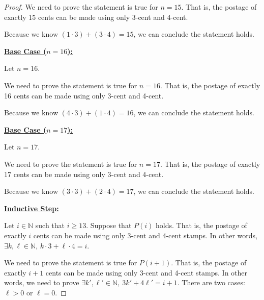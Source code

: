 \documentclass[12pt]{article}
\begin{document}
\begin{itemize}
\begin{proof}
    We need to prove the statement is true for $n = 15$. That is, the
    postage of exactly 15 cents can be made using only 3-cent and 4-cent.

    \bigskip

    Because we know $(1 \cdot 3) + (3 \cdot 4)=15$, we can conclude the statement holds.

    \bigskip

    \underline{\textbf{Base Case ($n = 16$):}}

    \bigskip

    Let $n = 16$.

    \bigskip

    We need to prove the statement is true for $n = 16$. That is, the
    postage of exactly 16 cents can be made using only 3-cent and 4-cent.

    \bigskip

    Because we know $(4 \cdot 3) + (1 \cdot 4)=16$, we can conclude the statement holds.

    \bigskip

    \underline{\textbf{Base Case ($n = 17$):}}

    \bigskip

    Let $n = 17$.

    \bigskip

    We need to prove the statement is true for $n = 17$. That is, the
    postage of exactly 17 cents can be made using only 3-cent and 4-cent.

    \bigskip

    Because we know $(3 \cdot 3) + (2 \cdot 4)=17$, we can conclude the statement holds.

    \bigskip

    \underline{\textbf{Inductive Step:}}

    \bigskip

    Let $i \in \mathbb{N}$ such that $i \geq 13$. Suppose that $P(i)$ holds. That is, the postage of
    exactly $i$ cents can be made using only 3-cent and 4-cent stamps. In other words,
    $\exists k, \ell \in \mathbb{N}$, $k \cdot 3 + \ell \cdot 4 = i$.

    \bigskip

    We need to prove the statement is true for $P(i+1)$. That is, the postage
    of exactly $i+1$ cents can be made using only 3-cent and 4-cent stamps. In other
    words, we need to prove $\exists k', \ell' \in \mathbb{N},\:
    3k' + 4\ell' = i + 1$. There are two cases: $\ell > 0$
    or $\ell = 0$.


\end{proof}
\end{itemize}
\end{document}
